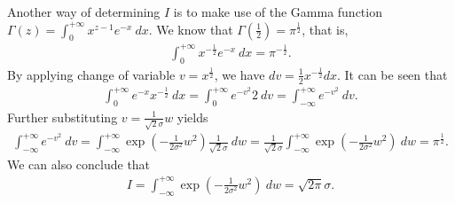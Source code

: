 \begin{answer}{}
	Another way of determining $I$ is to make use of the Gamma function $\Gamma(z) = \int_{0}^{+\infty} x^{z-1}e^{-x}\ dx$. We know that $\Gamma(\frac{1}{2}) = \pi^{\frac{1}{2}}$, that is,
	\begin{align}
		\int_{0}^{+\infty} x^{-\frac{1}{2}}e^{-x}\ dx = \pi^{-\frac{1}{2}}.
	\end{align}
	By applying change of variable $v = x^{\frac{1}{2}}$,  we have $dv = \frac{1}{2}x^{-\frac{1}{2}}dx$. It can be seen that
	\begin{align}
		\int_{0}^{+\infty} e^{-x}x^{-\frac{1}{2}}\ dx = \int_{0}^{+\infty} e^{-v^2} 2\ dv = \int_{-\infty}^{+\infty} e^{-v^2}\ dv.
	\end{align} 
	Further substituting $v = \frac{1}{\sqrt{2}\sigma}w$ yields
	\begin{align}
		\int_{-\infty}^{+\infty} e^{-v^2}\ dv = \int_{-\infty}^{+\infty} \exp\left(-\frac{1}{2\sigma^2}w^2\right)\frac{1}{\sqrt{2}\sigma} \ dw = \frac{1}{\sqrt{2}\sigma} \int_{-\infty}^{+\infty} \exp\left(-\frac{1}{2\sigma^2}w^2\right) \ dw = \pi^{\frac{1}{2}}.
	\end{align}
	We can also conclude that
	\begin{align}
		I = \int_{-\infty}^{+\infty} \exp\left(-\frac{1}{2\sigma^2}w^2\right) \ dw = \sqrt{2\pi}\sigma.
	\end{align}
\end{answer}